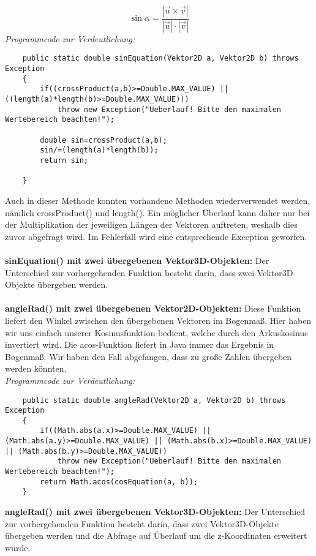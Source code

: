 \documentclass[a4paper,11pt]{scrartcl}
\begin{document}
\[ \sin \alpha = \frac{ | \vec u \times \vec v | }{| \vec  u | \cdot | \vec  v | } \]
\textit{Programmcode zur Verdeutlichung:}
\begin{lstlisting}
	public static double sinEquation(Vektor2D a, Vektor2D b) throws Exception
	{
		if((crossProduct(a,b)>=Double.MAX_VALUE) || ((length(a)*length(b)>=Double.MAX_VALUE)))
			throw new Exception("Ueberlauf! Bitte den maximalen Wertebereich beachten!");
		
		double sin=crossProduct(a,b);
		sin/=(length(a)*length(b));
		return sin; 

	}
\end{lstlisting}
Auch in dieser Methode konnten vorhandene Methoden wiederverwendet werden, nämlich crossProduct() und length(). Ein möglicher Überlauf kann daher nur bei der Multiplikation der jeweiligen Längen der Vektoren auftreten, weshalb dies zuvor abgefragt wird. Im Fehlerfall wird eine entsprechende Exception geworfen.\\
\\
\textbf{sinEquation() mit zwei übergebenen Vektor3D-Objekten:} Der Unterschied zur vorhergehenden Funktion besteht darin, dass zwei Vektor3D-Objekte übergeben werden.\\
\\
\textbf{angleRad() mit zwei übergebenen Vektor2D-Objekten:} Diese Funktion liefert den Winkel zwischen den übergebenen Vektoren im Bogenmaß. Hier haben wir uns einfach unserer Kosinusfunktion bedient, welche durch den Arkuskosinus invertiert wird. Die acos-Funktion liefert in Java immer das Ergebnis in Bogenmaß.
Wir haben den Fall abgefangen, dass zu große Zahlen übergeben werden könnten.\\
\textit{Programmcode zur Verdeutlichung:}
\begin{lstlisting}
	public static double angleRad(Vektor2D a, Vektor2D b) throws Exception
	{
		if((Math.abs(a.x)>=Double.MAX_VALUE) || (Math.abs(a.y)>=Double.MAX_VALUE) || (Math.abs(b.x)>=Double.MAX_VALUE) || (Math.abs(b.y)>=Double.MAX_VALUE))
			throw new Exception("Ueberlauf! Bitte den maximalen Wertebereich beachten!");
		return Math.acos(cosEquation(a, b));
	}
\end{lstlisting} $\;$ \\
\textbf{angleRad() mit zwei übergebenen Vektor3D-Objekten:} Der Unterschied zur vorhergehenden Funktion besteht darin, dass zwei Vektor3D-Objekte übergeben werden und die Abfrage auf Überlauf um die z-Koordinaten erweitert wurde.\\
\\
\end{document}
